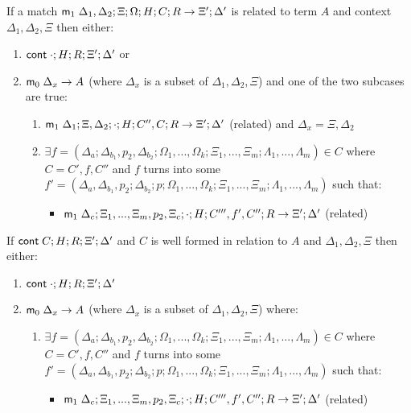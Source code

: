 If a match $\mathsf{m}_1 \; \Delta_1, \Delta_2; \Xi; \Omega; H; C; R \rightarrow \Xi'; \Delta'$ is related to term $A$ and context $\Delta_1, \Delta_2, \Xi$ then either:\\
\begin{enumerate}
   \item $\mathsf{cont} \; \cdot; H; R; \Xi'; \Delta'$ or
   \item $\mathsf{m}_0 \; \Delta_x \rightarrow A$ (where $\Delta_x$ is a subset of $\Delta_1, \Delta_2, \Xi$) and one of the two subcases are true:
      \begin{enumerate}
         \item $\mathsf{m}_1 \; \Delta_1; \Xi, \Delta_2; \cdot; H; C'', C; R \rightarrow \Xi'; \Delta'$ (related) and $\Delta_x = \Xi, \Delta_2$
         \item $\exists f = (\Delta_a; \Delta_{b_1}, p_2, \Delta_{b_2}; \Omega_1, ..., \Omega_k; \Xi_1, ..., \Xi_m; \Lambda_1, ..., \Lambda_m) \in C$ where $C = C', f, C''$ and $f$ turns into some $f' = (\Delta_a, \Delta_{b_1}, p_2; \Delta_{b_2}; p; \Omega_1, ..., \Omega_k; \Xi_1, ..., \Xi_m; \Lambda_1, ..., \Lambda_m)$ such that:
            \begin{itemize}
               \item $\mathsf{m}_1 \; \Delta_c; \Xi_1, ..., \Xi_m, p_2, \Xi_c; \cdot; H; C''', f', C''; R \rightarrow \Xi'; \Delta'$ (related)
            \end{itemize}
      \end{enumerate}
\end{enumerate}

If $\mathsf{cont} \; C; H; R; \Xi'; \Delta'$ and $C$ is well formed in relation to $A$ and $\Delta_1, \Delta_2, \Xi$ then either:\\
\begin{enumerate}
   \item $\mathsf{cont} \; \cdot; H; R; \Xi'; \Delta'$
   \item $\mathsf{m}_0 \; \Delta_x \rightarrow A$ (where $\Delta_x$ is a subset of $\Delta_1, \Delta_2, \Xi$) where:
   \begin{enumerate}
      \item $\exists f = (\Delta_a; \Delta_{b_1}, p_2, \Delta_{b_2}; \Omega_1, ..., \Omega_k; \Xi_1, ..., \Xi_m; \Lambda_1, ..., \Lambda_m) \in C$ where $C = C', f, C''$ and $f$ turns into some $f' = (\Delta_a, \Delta_{b_1}, p_2; \Delta_{b_2}; p; \Omega_1, ..., \Omega_k; \Xi_1, ..., \Xi_m; \Lambda_1, ..., \Lambda_m)$ such that:
         \begin{itemize}
            \item $\mathsf{m}_1 \; \Delta_c; \Xi_1, ..., \Xi_m, p_2, \Xi_c; \cdot; H; C''', f', C''; R \rightarrow \Xi'; \Delta'$ (related)
         \end{itemize}
   \end{enumerate}
\end{enumerate}

